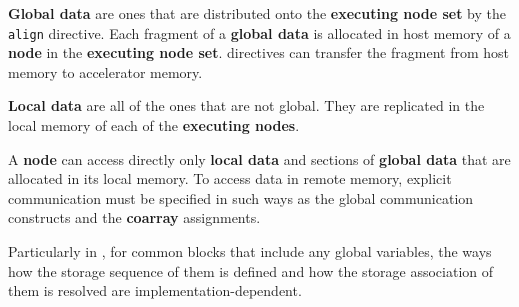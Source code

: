{\bf Global data} are ones that are distributed onto the {\bf executing node set} by the {\tt align} directive.
Each fragment of a {\bf global data} is allocated in host memory of a {\bf node} in the {\bf executing node set}.
{\OACC} directives can transfer the fragment from host memory to accelerator memory.

{\bf Local data} are all of the ones that are not global.
They are replicated in the local memory of each of the {\bf executing nodes}.

A {\bf node} can access directly only {\bf local data} and sections of {\bf global data} that are allocated in its local memory.
To access data in remote memory, 
explicit communication must be specified in such ways as the global communication constructs and the {\bf coarray} assignments.

Particularly in {\XACCF}, 
for common blocks that include any global variables, 
the ways how the storage sequence of them is defined and how the storage association of them is resolved are implementation-dependent.




